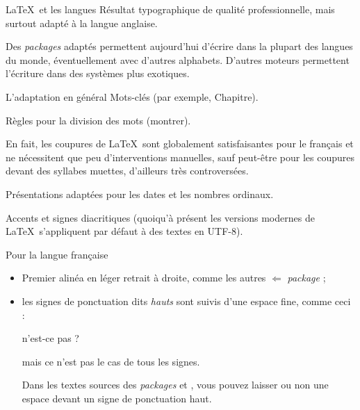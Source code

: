 \documentclass[pdf]{beamer}
\begin{document}
\begin{frame}{\LaTeX\ et les langues}
Résultat typographique de qualité professionnelle, mais surtout adapté à la
langue anglaise.\pause

Des \foreignlanguage{english}{\emph{packages}} adaptés permettent aujourd'hui
d'écrire dans la plupart des langues du monde, éventuellement avec d'autres
alphabets. D'autres moteurs permettent l'écriture dans des systèmes plus \og
exotiques\fg.
\end{frame}

\begin{frame}{L'adaptation en général}
Mots-clés (par exemple, \og Chapitre\fg).\pause

Règles pour la division des mots (montrer).\pause

En fait, les coupures de \LaTeX\ sont globalement satisfaisantes pour le
français et ne nécessitent que peu d'interventions manuelles, sauf peut-être
pour les coupures devant des syllabes muettes, d'ailleurs très
controversées.\pause

Présentations adaptées pour les dates et les nombres ordinaux.\pause

Accents et signes diacritiques (quoiqu'à présent les versions modernes de
\LaTeX\ s'appliquent par défaut à des textes en
\foreignlanguage{english}{UTF-8}).
\end{frame}

\begin{frame}{Pour la langue française}
\begin{itemize}
 \item Premier alinéa en léger retrait à droite, comme les autres
$\Longleftarrow$ \foreignlanguage{english}{\emph{package}
} ;\pause
 \item les signes de ponctuation dits \emph{hauts} sont suivis d'une espace
fine, comme ceci :

n'est-ce pas ?

mais ce n'est pas le cas de tous les signes.\pause

Dans les textes sources des \foreignlanguage{english}{\emph{packages}
} et \foreignlanguage{english}{},
vous pouvez laisser ou non une espace devant un signe de ponctuation haut.
\end{itemize}
\end{frame}
\end{document}
